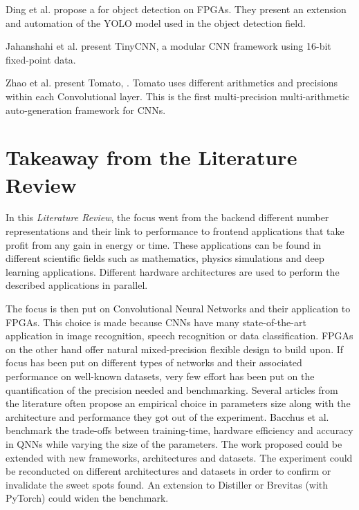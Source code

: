  Ding et al. \cite{Ding2019} propose a  for object detection on FPGAs. They present an extension and automation of the YOLO model used in the object detection field.

 Jahanshahi et al. \cite{Jahanshahi2019} present TinyCNN, a modular CNN framework using 16-bit fixed-point data.

 Zhao et al. \cite{Zhao2019} present Tomato, . Tomato uses different arithmetics and precisions within each Convolutional layer. This is the first multi-precision multi-arithmetic auto-generation framework for CNNs.



\section{Takeaway from the Literature Review}
In this \emph{Literature Review}, the focus went from the backend different number representations and their link to performance to frontend applications that take profit from any gain in energy or time. These applications can be found in different scientific fields such as mathematics, physics simulations and deep learning applications. Different hardware architectures are used to perform the described applications in parallel.

The focus is then put on Convolutional Neural Networks and their application to FPGAs. This choice is made because CNNs have many state-of-the-art application in image recognition, speech recognition or data classification. FPGAs on the other hand offer natural mixed-precision flexible design to build upon. If focus has been put on different types of networks and their associated performance on well-known datasets, very few effort \cite{Bacchus2020} has been put on the quantification of the precision needed and benchmarking. Several articles from the literature often propose an empirical choice in parameters size along with the architecture and performance they got out of the experiment. Bacchus et al. \cite{Bacchus2020} benchmark the trade-offs between training-time, hardware efficiency and accuracy in QNNs while varying the size of the parameters. The work proposed could be extended with new frameworks, architectures and  datasets. The experiment could be reconducted on different architectures and datasets in order to confirm or invalidate the sweet spots found. An extension to Distiller or Brevitas (with PyTorch) could widen the benchmark.

